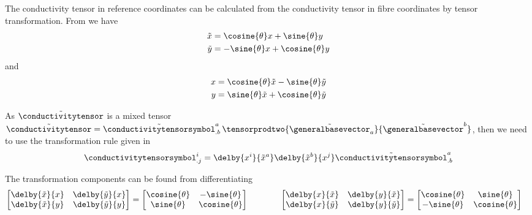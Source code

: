 The conductivity tensor in reference coordinates can be calculated
from the conductivity tensor in fibre coordinates by tensor
transformation. From  we have
\begin{equation}
  \begin{aligned}
    \tilde{x}&=\cosine{\theta}x+\sine{\theta}y\\
    \tilde{y}&=-\sine{\theta}x+\cosine{\theta}y
  \end{aligned}
  \label{eqn:AnisoPlateFibreFromSpatialCoordinates}
\end{equation}
and
\begin{equation}
  \begin{aligned}
    x&=\cosine{\theta}\tilde{x}-\sine{\theta}\tilde{y}\\
    y&=\sine{\theta}\tilde{x}+\cosine{\theta}\tilde{y}
  \end{aligned}
  \label{eqn:AnisoPlateSpatialFromFibreCoordinates}
\end{equation}

As $\tilde{\conductivitytensor}$ is a mixed tensor \ie
$\tilde{\conductivitytensor}=\tilde{\conductivitytensorsymbol}^{a}_{.b}\,\tensorprodtwo{\tilde{\generalbasevector}_{a}}{\tilde{\generalbasevector}^{b}}$,
then we need to use the transformation rule given in
\ie
\begin{equation}
  \conductivitytensorsymbol^{i}_{.j}=\delby{x^{i}}{\tilde{x}^{a}}\delby{\tilde{x}^{b}}{x^{j}}\tilde{\conductivitytensorsymbol}^{a}_{.b}
  \label{eqn:AnsioPlateConductivityTensorTransformation}
\end{equation}

The transformation components can be found from differentiating
\ie
\begin{equation}
  \begin{aligned}
    \begin{bmatrix}
      \delby{\tilde{x}}{x} & \delby{\tilde{y}}{x} \\
      \delby{\tilde{x}}{y} & \delby{\tilde{y}}{y}
    \end{bmatrix} &=
    \begin{bmatrix}
      \cosine{\theta} & -\sine{\theta} \\
      \sine{\theta} & \cosine{\theta}
    \end{bmatrix} &\qquad&&
    \begin{bmatrix}
      \delby{x}{\tilde{x}} & \delby{y}{\tilde{x}} \\
      \delby{x}{\tilde{y}} & \delby{y}{\tilde{y}}
    \end{bmatrix}&=
    \begin{bmatrix}
      \cosine{\theta} & \sine{\theta} \\
      -\sine{\theta} & \cosine{\theta}
    \end{bmatrix}
  \end{aligned}
\end{equation}

